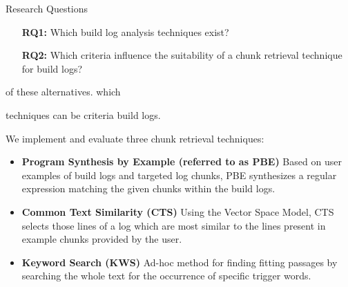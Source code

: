 \begin{simplebox}{Research Questions}
\begin{itemize}
  \item[\textbf{RQ1:}] Which build log analysis techniques exist?
  \item[\textbf{RQ2:}] Which criteria influence the suitability of a chunk
  retrieval technique for build logs?
\end{itemize}
\end{simplebox}

of these
alternatives.
which

techniques
can be
criteria
build logs.

We implement and evaluate three chunk retrieval techniques:
\begin{itemize}
  \item \textbf{Program Synthesis by Example (referred to as PBE)}
  Based on user examples of build logs and targeted log chunks, PBE
  synthesizes
  a regular expression matching the given chunks within the build logs.
  \item \textbf{Common Text Similarity (CTS)}
  Using the Vector Space Model, CTS selects those lines of a log which are
  most similar to the lines present in example chunks provided by
  the user.
  \item \textbf{Keyword Search (KWS)}
  Ad-hoc method for finding fitting passages by searching the whole
  text for
  the occurrence of specific trigger words.
\end{itemize}

